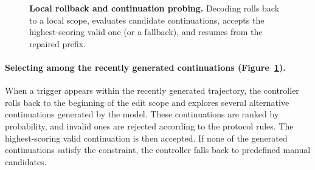 \documentclass[twocolumn]{article}
\begin{document}
\begin{figure}[!htbp]
{%
  } \caption{\textbf{Local rollback and continuation probing.} Decoding rolls
    back to a local scope, evaluates candidate continuations, accepts the
    highest-scoring valid one (or a fallback), and resumes from the repaired
    prefix.}\label{fig:ae_local_rollback}
\end{figure}

\paragraph{Selecting among the recently generated continuations
(Figure~\ref{fig:ae_local_rollback}).} When a trigger appears within the
recently generated trajectory, the controller rolls back to the beginning of the
edit scope and explores several alternative continuations generated by the
model. These continuations are ranked by probability, and invalid ones are
rejected according to the protocol rules. The highest-scoring valid continuation
is then accepted. If none of the generated continuations satisfy the constraint,
the controller falls back to predefined manual candidates.
\end{document}
